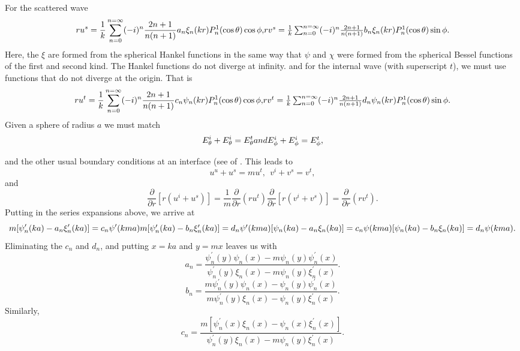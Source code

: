 For the scattered wave
\begin{equation}
ru^s= \frac{1}{k} \sum_{n=0}^{n=\infty} (-i)^n
\frac{ 2n+1}{n(n+1)} a_n \xi_n (k r) P^1_n(\cos \theta) \cos \phi,
$$    $$
rv^s= \frac{1}{k} \sum_{n=0}^{n=\infty} (-i)^n
\frac{ 2n+1}{n(n+1)} b_n \xi_n (k r) P^1_n(\cos \theta) \sin \phi.
\end{equation}
Here, the $\xi$  are formed from the spherical Hankel functions in the same 
way that $\psi$ and $\chi$ were formed from the spherical Bessel functions
of the first and second kind.  The  Hankel functions do not diverge at infinity. and for the internal wave (with superscript $t$), we must use functions that do not diverge at the origin. That is
\begin{equation}
ru^t= \frac{1}{k} \sum_{n=0}^{n=\infty} (-i)^n
\frac{ 2n+1}{n(n+1)} c_n \psi_n (k r) P^1_n(\cos \theta) \cos \phi,
$$    $$
rv^t= \frac{1}{k} \sum_{n=0}^{n=\infty} (-i)^n
\frac{ 2n+1}{n(n+1)} d_n \psi_n (k r) P^1_n(\cos \theta) \sin \phi.
\end{equation}
Given a sphere of radius $a$ we must match
\begin{equation}
E^i_\theta +E^i_\theta=E^t_\theta
$$ and   $$
E^i_\phi +E^i_\phi=E^t_\phi,
\end{equation}

and the other usual boundary conditions at an interface (see  of \cite{FeynLect:Mybib}. This leads to
\begin{equation}
u^u+u^s=mu^t, \> \> v^i+v^s=v^t,
\end{equation}
and 
\begin{equation}
\frac{\partial}{\partial r}[r (u^i+u^s)]
 =\frac{1}{m} \frac{\partial}{\partial r} (r u^t)
\frac{\partial}{\partial r}[r (v^i+v^s)]
 =\frac{\partial}{\partial r} (r v^t).
\end{equation}
Putting in the series expansions above, we arrive at
\begin{equation}
m[\psi^\prime_n(ka)-a_n \xi^\prime_n(ka)]=c_n \psi^\prime(kma)
$$   $$
m[\psi^\prime_n(ka)-b_n \xi^\prime_n(ka)]=d_n \psi^\prime(kma)
$$   $$
[\psi_n(ka)-a_n \xi_n(ka)]=c_n \psi(kma)
$$   $$
[\psi_n(ka)-b_n \xi_n(ka)]=d_n \psi(kma).
\end{equation}
Eliminating the $c_n$ and $d_n$, and putting $x=ka$ and $y=mx$ leaves us with
\begin{equation}
a_n=\frac{\psi^\prime_n(y)\psi_n(x)-m \psi_n(y) \psi^\prime_n(x)}{
   \psi^\prime_n(y) \xi_n(x)-m \psi_n(y) \xi^\prime_n(x)}.
\end{equation}
\begin{equation}
b_n=\frac{m \psi^\prime_n(y)\psi_n(x)- \psi_n(y) \psi^\prime_n(x)}{
  m \psi^\prime_n(y) \xi_n(x)- \psi_n(y) \xi^\prime_n(x)}.
\end{equation}
Similarly,
\begin{equation}
c_n=\frac{ m[\psi^\prime_n(x)\xi_n(x)- \psi_n(x) \xi^\prime_n(x)]}{
   \psi^\prime_n(y) \xi_n(x)-m \psi_n(y) \xi^\prime_n(x)}.
\end{equation}

